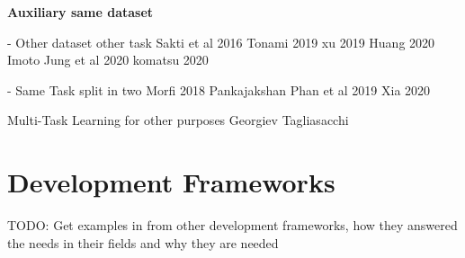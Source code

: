 \textbf{Auxiliary same dataset}



- Other dataset other task
Sakti et al 2016
Tonami 2019
xu 2019
Huang 2020
Imoto
Jung et al 2020
komatsu 2020


- Same Task split in two
Morfi 2018
Pankajakshan
Phan et al 2019
Xia 2020


Multi-Task Learning for other purposes
Georgiev
Tagliasacchi




\section{Development Frameworks}
TODO: Get examples in from other development frameworks, how they answered the needs in their fields and why they are needed

